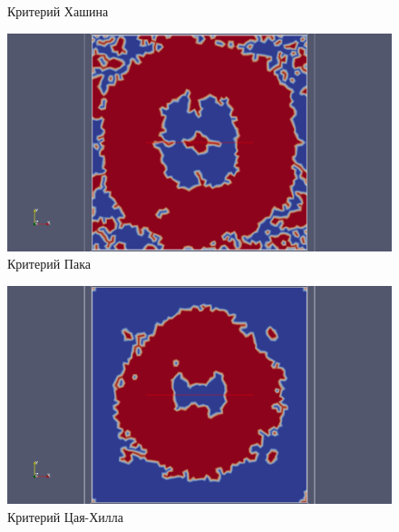 \documentclass[xcolor={usenames,dvipsnames,svgnames,table}]{beamer}
\begin{document}
\begin{frame}
\begin{center}
\begin{minipage}[h]{0.33\textwidth}
\begin{figure}[h]
                \tiny
                \caption{Критерий Хашина}
            \end{figure}
        \end{minipage}
        \begin{minipage}[h]{0.33\textwidth}
            \begin{figure}[h]
                \includegraphics[width=\textwidth]{png/destruction/2lg-puck-delam.png}
                \tiny
                \caption{Критерий Пака}
            \end{figure}
        \end{minipage}
        \begin{minipage}[h]{0.33\textwidth}
            \begin{figure}[h]
                \includegraphics[width=\textwidth]{png/destruction/2lg-tsaihill-delam.png}
                \tiny
                \caption{Критерий Цая-Хилла}
            \end{figure}
        \end{minipage}
        \begin{minipage}[h]{0.33\textwidth}
            \begin{figure}[h]

\end{figure}
\end{minipage}
\end{center}
\end{frame}
\end{document}
